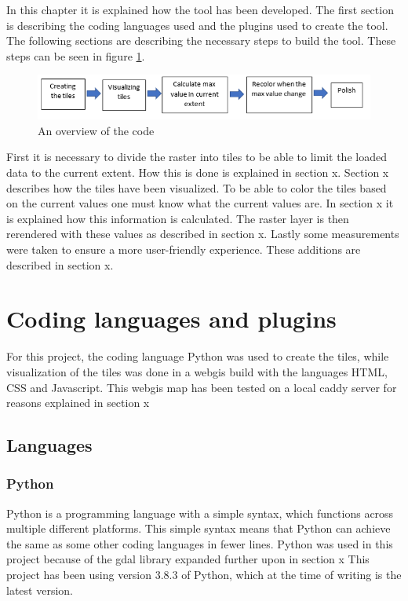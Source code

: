 In this chapter it is explained how the tool has been developed. The first section is describing the coding languages used and the plugins used to create the tool. The following sections are describing the necessary steps to build the tool. These steps can be seen in figure \ref{DevelopmentSteps}.

\begin{figure} [H]
	\centering
	\includegraphics[width=.8\textwidth]{Pictures/DevelopmentSteps}
	\caption{An overview of the code}
	\label{DevelopmentSteps}
\end{figure}

First it is necessary to divide the raster into tiles to be able to limit the loaded data to the current extent. How this is done is explained in section x. Section x describes how the tiles have been visualized. To be able to color the tiles based on the current values one must know what the current values are. In section x it is explained how this information is calculated. The raster layer is then rerendered with these values as described in section x. Lastly some measurements were taken to ensure a more user-friendly experience. These additions are described in section x. 


\chapter{Coding languages and plugins}
For this project, the coding language Python was used to create the tiles, while visualization of the tiles was done in a webgis build with the languages HTML, CSS and Javascript. This webgis map has been tested on a local caddy server for reasons explained in section x

\section{Languages}
\subsection*{Python}
Python is a programming language with a simple syntax, which functions across multiple different platforms. This simple syntax means that Python can achieve the same as some other coding languages in fewer lines.\citep{WhatIsPython}
Python was used in this project because of the gdal library expanded further upon in section x
This project has been using version 3.8.3 of Python, which at the time of writing is the latest version. \citep{PythonVersion}
